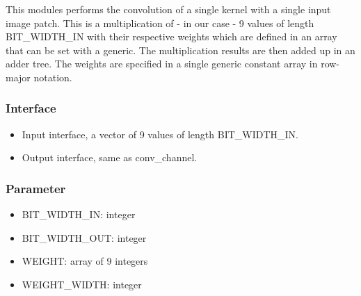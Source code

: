 This modules performs the convolution of a single kernel with a single input image patch. This is a multiplication of - in our case - 9 values of length BIT\_WIDTH\_IN with their respective weights which are defined in an array that can be set with a generic. The multiplication results are then added up in an adder tree. The weights are specified in a single generic constant array in row-major notation.

\subsubsection{Interface}
\begin{itemize}
	\item Input interface, a vector of 9 values of length BIT\_WIDTH\_IN.
	\item Output interface, same as conv\_channel.
\end{itemize}

\subsubsection{Parameter}
\begin{itemize}
	\item BIT\_WIDTH\_IN: integer
	\item BIT\_WIDTH\_OUT: integer
	\item WEIGHT: array of 9 integers
	\item WEIGHT\_WIDTH: integer
\end{itemize}
